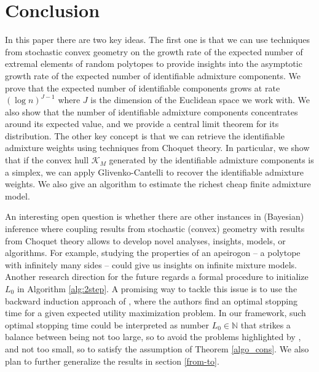 \documentclass[12pt, reqno]{amsart}
\theoremstyle{definition}
\begin{document}
\section{Conclusion}\label{concl}
In this paper there are two key ideas. The first one is that we can use techniques from stochastic convex geometry on the growth rate of the expected number of extremal elements of random polytopes to provide insights into the asymptotic growth rate of the expected number of identifiable admixture components. We prove that the expected number of identifiable components grows at rate $(\log n)^{J-1}$ where $J$ is the dimension of the Euclidean space we work with.
We also show that the number of identifiable admixture components concentrates around its expected value, and we provide a central limit theorem for its distribution. 
The other key concept is that we can retrieve the identifiable admixture weights using techniques from Choquet theory. In particular, we show that if the convex hull $\mathcal{K}_M$ generated by the identifiable admixture components is a simplex, we can apply Glivenko-Cantelli to recover the identifiable admixture weights. We also give an algorithm to estimate the richest cheap finite admixture model. 


An interesting open question is whether there are other instances in (Bayesian) inference where coupling results from stochastic (convex) geometry with results from Choquet theory allows to develop novel analyses, insights, models, or algorithms. For example, studying the properties of an apeirogon -- a polytope with infinitely many sides -- could give us insights on infinite mixture models. Another research direction for the future regards a formal procedure to initialize $L_0$ in Algorithm \ref{alg:2step}. A promising way to tackle this issue is to use the backward induction approach of \cite[Section 1.2]{peskir}, where the authors find an optimal stopping time for a given expected utility maximization problem. In our framework, such optimal stopping time could be interpreted as number $L_0\in\mathbb{N}$ that strikes a balance between being not too large, so to avoid the problems highlighted by \cite{dwivedi}, and not too small, so to satisfy the assumption of Theorem \ref{algo_cons}. We also plan to further generalize the results in section \ref{from-to}.
\end{document}
